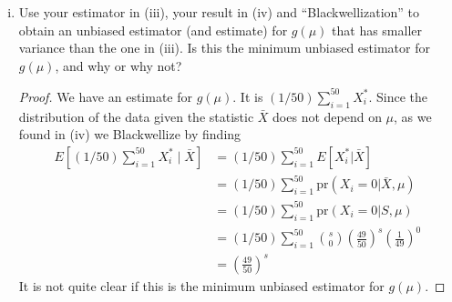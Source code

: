 \documentclass[letterpaper, 12pt]{article}
\newcommand{\pr}{\text{pr}}
\newcommand{\sbs}{\;|\;} %
\begin{document}
\begin{enumerate}
\begin{enumerate}[(i)]
\item
Use your estimator in (iii), your result in (iv) and ``Blackwellization'' to obtain an unbiased estimator (and estimate) for $g(\mu)$ that has smaller variance than the one in (iii). Is this the minimum unbiased estimator for $g(\mu)$, and why or why not? 

\begin{proof}
We have an estimate for $g(\mu)$. It is $(1/50)\sum_{i=1}^{50} X_i^*$. Since the distribution of the data given the statistic $\bar{X}$ does not depend on $\mu$, as we found in (iv) we Blackwellize by finding
\begin{align}
E\left[(1/50)\sum_{i=1}^{50} X_i^* \sbs \bar{X} \right] 
&= (1/50) \sum_{i=1}^{50} E[X_i^* | \bar{X}] \\
&= (1/50) \sum_{i=1}^{50} \pr(X_i = 0 | \bar{X}, \mu) \\
&= (1/50) \sum_{i=1}^{50} \pr(X_i = 0 | S, \mu) \\
&= (1/50) \sum_{i=1}^{50} 
\binom{s}{0} 
\left(\frac{49}{50}\right)^s 
\left( \frac{1}{49} \right)^{0}\\
&= \left(\frac{49}{50}\right)^s
\end{align}
It is not quite clear if this is the minimum unbiased estimator for $g(\mu)$.
\end{proof}
\end{enumerate}

\end{enumerate}
\end{document}
